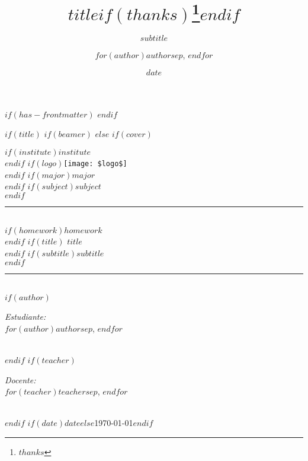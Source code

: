 \documentclass[
    $if(fontsize)$
      $fontsize$,
    $endif$
    $if(lang)$
      $babel-lang$,
    $endif$
    $if(papersize)$
      $papersize$paper,
    $endif$
    $if(beamer)$
        ignorenonframetext,
        $if(handout)$
          handout,
        $endif$
        $if(aspectratio)$
          aspectratio=$aspectratio$,
        $endif$
    $endif$
    $for(classoption)$
      $classoption$$sep$,
    $endfor$
]{$documentclass$}
\title{$title$$if(thanks)$\thanks{$thanks$}$endif$}
\subtitle{$subtitle$}
\author{$for(author)$$author$$sep$, $endfor$}
\date{$date$}
\institute{$for(institute)$$institute$$sep$, $endfor$}
\begin{document}
$if(has-frontmatter)$
\frontmatter
$endif$

$if(title)$
    $if(beamer)$
        \frame{\titlepage}
    $else$
        $if(cover)$
            \begin{titlepage}
            \newcommand{\HRule}{\rule{\linewidth}{0.5mm}}
            \center
            $if(institute)$\textsc{\LARGE $institute$}\\[0.5cm]$endif$
            $if(logo)$\texttt{[image: \$logo\$]}\\[1cm]$endif$
            $if(major)$\textsc{\Large $major$}\\$endif$
            $if(subject)$\textsc{\large $subject$}\\[0.5cm]$endif$
            \HRule \\[0.4cm]
            $if(homework)$$homework$\\[0.2cm]$endif$
            $if(title)${ \huge \bfseries $title$}\\[0.2cm]$endif$
            $if(subtitle)${\large $subtitle$}\\[0.4cm]$endif$
            \HRule \\[1cm]
            $if(author)$
                \begin{minipage}{0.4\textwidth}
                \begin{flushleft} \large
                \emph{Estudiante:}\\
                \textsc{$for(author)$$author$$sep$, $endfor$}
                \end{flushleft}
                \end{minipage}\\[1cm]
            $endif$
            $if(teacher)$
                \begin{minipage}{0.4\textwidth}
                \begin{flushright} \large
                \emph{Docente:}\\
                \textsc{$for(teacher)$$teacher$$sep$, $endfor$}
                \end{flushright}
                \end{minipage}\\[1cm]
            $endif$
            {\large $if(date)$$date$$else$\today$endif$}
            \vfill
            \end{titlepage}
\end{document}

